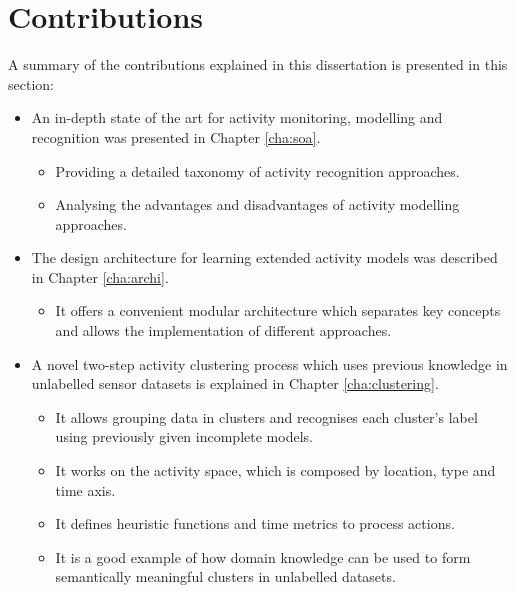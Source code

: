 \section{Contributions}
\label{sec:conclusions:contrib}

A summary of the contributions explained in this dissertation is presented in this section:

\begin{itemize}
 \item An in-depth state of the art for activity monitoring, modelling and recognition was presented in Chapter \ref{cha:soa}.
 \begin{itemize}
  \item Providing a detailed taxonomy of activity recognition approaches.
  \item Analysing the advantages and disadvantages of activity modelling approaches.
 \end{itemize}

 \begin{comment}
 \item A knowledge representation formalism for activities and intelligent environments was presented in Chapter \ref{cha:archi}.
 \begin{itemize}
  \item It offers a light-weight knowledge representation and processing framework based on JavaScript Object Notation (JSON) technology.
  \item It uses compact and easy-to-extend structures for activities, objects, locations and sensors, to achieve environment independence.
 \end{itemize}
 \end{comment}

 \item The design architecture for learning extended activity models was described in Chapter \ref{cha:archi}.
 \begin{itemize}
  \item It offers a convenient modular architecture which separates key concepts and allows the implementation of different approaches.
 \end{itemize}

 \item A novel two-step activity clustering process which uses previous knowledge in unlabelled sensor datasets is explained in Chapter \ref{cha:clustering}. %
 \begin{itemize}  
  \item It allows grouping data in clusters and recognises each cluster's label using previously given incomplete models.
  \item It works on the activity space, which is composed by location, type and time axis.
  \item It defines heuristic functions and time metrics to process actions.
  \item It is a good example of how domain knowledge can be used to form semantically meaningful clusters in unlabelled datasets.
 \end{itemize}


\end{itemize}
